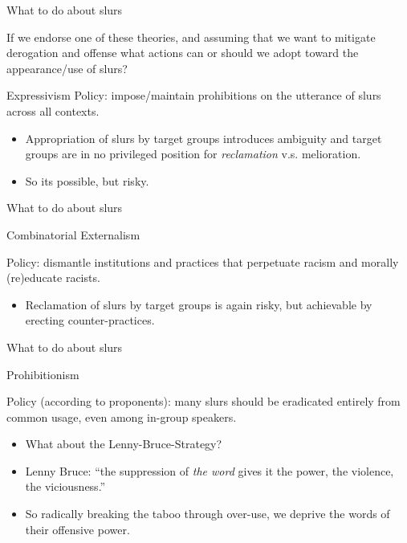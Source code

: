 \documentclass[xcolor=dvipsnames,12pt,handout]{beamer}
\begin{document}
\begin{frame}{What to do about slurs}

If we endorse one of these theories, and assuming that we want to mitigate derogation and offense what actions can or should we adopt toward the appearance/use of slurs?
\begin{block}{Expressivism}
\pause
Policy: impose/maintain prohibitions on the utterance of slurs across all contexts. 
\pause
	\begin{itemize}
	\item Appropriation of slurs by target groups introduces ambiguity and target groups are in no privileged position for \textit{reclamation} v.s. melioration.
	\pause
	\item So its possible, but risky.   
	\end{itemize}

\end{block}

\end{frame}

\begin{frame}{What to do about slurs}

\vspace{-1cm}
\begin{block}{Combinatorial Externalism}

\pause
Policy: dismantle institutions and practices that perpetuate racism and morally (re)educate racists.
\pause
	\begin{itemize}
	\item Reclamation of slurs by target groups is again risky, but achievable by erecting counter-practices.
	\end{itemize}

\end{block}
\end{frame}

\begin{frame}{What to do about slurs}
\vspace{-1cm}

\begin{block}{Prohibitionism}
\pause

Policy (according to proponents): many slurs should be eradicated entirely from common usage, even among in-group speakers.

\pause
	\begin{itemize}
	\item What about the Lenny-Bruce-Strategy?
	\pause
	\item Lenny Bruce: ``the suppression of \textit{the word} gives it the power, the violence, the viciousness.''
	\pause
	\item So radically breaking the taboo through over-use, we deprive the words of their offensive power.
	\end{itemize}

\end{block} 
\end{frame}
\end{document}
